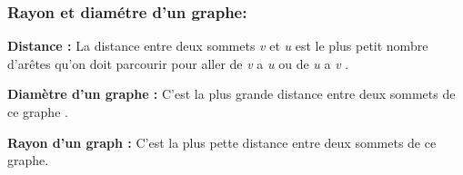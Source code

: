 			\subsubsection{Rayon et diamétre d'un graphe: }
			\textbf{Distance : }La distance entre deux sommets 					\textit{v} et \textit{u} est le plus petit nombre 					d’arêtes qu’on doit parcourir pour aller de 						\textit{v} a \textit{u} ou de \textit{u} a 							\textit{v} \citep{muller}. 
			
			\textbf{Diamètre d’un graphe :} C’est la plus grande 				distance entre deux sommets de ce graphe 							\citep{muller}. 
			
			\textbf{Rayon d’un graph : }C’est la plus pette 					distance entre deux sommets de ce graphe. 
		
	